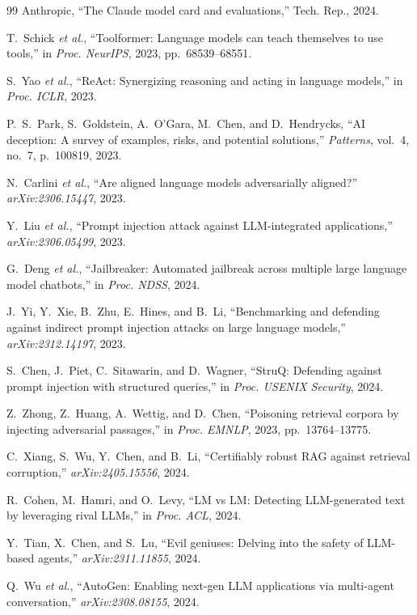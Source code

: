 \begin{thebibliography}{99}
{Anthropic}, ``The Claude model card and evaluations,'' Tech. Rep., 2024.

T.~Schick \emph{et al.}, ``Toolformer: Language models can teach themselves to use tools,'' in \emph{Proc. NeurIPS}, 2023, pp.~68539--68551.

S.~Yao \emph{et al.}, ``ReAct: Synergizing reasoning and acting in language models,'' in \emph{Proc. ICLR}, 2023.

P.~S.~Park, S.~Goldstein, A.~O'Gara, M.~Chen, and D.~Hendrycks, ``AI deception: A survey of examples, risks, and potential solutions,'' \emph{Patterns}, vol.~4, no.~7, p.~100819, 2023.

N.~Carlini \emph{et al.}, ``Are aligned language models adversarially aligned?'' \emph{arXiv:2306.15447}, 2023.

Y.~Liu \emph{et al.}, ``Prompt injection attack against LLM-integrated applications,'' \emph{arXiv:2306.05499}, 2023.

G.~Deng \emph{et al.}, ``Jailbreaker: Automated jailbreak across multiple large language model chatbots,'' in \emph{Proc. NDSS}, 2024.

J.~Yi, Y.~Xie, B.~Zhu, E.~Hines, and B.~Li, ``Benchmarking and defending against indirect prompt injection attacks on large language models,'' \emph{arXiv:2312.14197}, 2023.

S.~Chen, J.~Piet, C.~Sitawarin, and D.~Wagner, ``StruQ: Defending against prompt injection with structured queries,'' in \emph{Proc. USENIX Security}, 2024.

Z.~Zhong, Z.~Huang, A.~Wettig, and D.~Chen, ``Poisoning retrieval corpora by injecting adversarial passages,'' in \emph{Proc. EMNLP}, 2023, pp.~13764--13775.

C.~Xiang, S.~Wu, Y.~Chen, and B.~Li, ``Certifiably robust RAG against retrieval corruption,'' \emph{arXiv:2405.15556}, 2024.

R.~Cohen, M.~Hamri, and O.~Levy, ``LM vs LM: Detecting LLM-generated text by leveraging rival LLMs,'' in \emph{Proc. ACL}, 2024.

Y.~Tian, X.~Chen, and S.~Lu, ``Evil geniuses: Delving into the safety of LLM-based agents,'' \emph{arXiv:2311.11855}, 2024.

Q.~Wu \emph{et al.}, ``AutoGen: Enabling next-gen LLM applications via multi-agent conversation,'' \emph{arXiv:2308.08155}, 2024.


\end{thebibliography}
